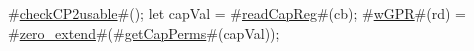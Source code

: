 #\hyperref[sailMIPSzcheckCP2usable]{checkCP2usable}#();
let capVal = #\hyperref[sailMIPSzreadCapReg]{readCapReg}#(cb);
#\hyperref[sailMIPSzwGPR]{wGPR}#(rd) = #\hyperref[sailMIPSzzzerozyextend]{zero\_extend}#(#\hyperref[sailMIPSzgetCapPerms]{getCapPerms}#(capVal));
